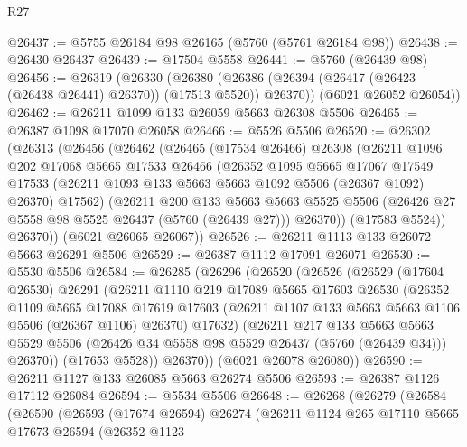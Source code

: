 \begin{lexlean}{R27}
\begin{coremodule}
@26437 := @5755 @26184 @98 @26165 (@5760 (@5761 @26184 @98))
@26438 := @26430 @26437
@26439 := @17504 @5558
@26441 := @5760 (@26439 @98)
@26456 := @26319
    (@26330
      (@26380 (@26386 (@26394 (@26417 (@26423 (@26438 @26441) @26370)) (@17513 @5520)) @26370))
      (@6021 @26052 @26054))
@26462 := @26211 @1099 @133 @26059 @5663 @26308 @5506
@26465 := @26387 @1098 @17070 @26058
@26466 := @5526 @5506
@26520 := @26302
    (@26313
      (@26456
        (@26462
          (@26465
            (@17534 @26466)
            @26308
            (@26211
              @1096
              @202
              @17068
              @5665
              @17533
              @26466
              (@26352
                @1095
                @5665
                @17067
                @17549
                @17533
                (@26211 @1093 @133 @5663 @5663 @1092 @5506 (@26367 @1092) @26370)
                @17562)
              (@26211
                @200
                @133
                @5663
                @5663
                @5525
                @5506
                (@26426 @27 @5558 @98 @5525 @26437 (@5760 (@26439 @27)))
                @26370))
            (@17583 @5524))
          @26370))
      (@6021 @26065 @26067))
@26526 := @26211 @1113 @133 @26072 @5663 @26291 @5506
@26529 := @26387 @1112 @17091 @26071
@26530 := @5530 @5506
@26584 := @26285
    (@26296
      (@26520
        (@26526
          (@26529
            (@17604 @26530)
            @26291
            (@26211
              @1110
              @219
              @17089
              @5665
              @17603
              @26530
              (@26352
                @1109
                @5665
                @17088
                @17619
                @17603
                (@26211 @1107 @133 @5663 @5663 @1106 @5506 (@26367 @1106) @26370)
                @17632)
              (@26211
                @217
                @133
                @5663
                @5663
                @5529
                @5506
                (@26426 @34 @5558 @98 @5529 @26437 (@5760 (@26439 @34)))
                @26370))
            (@17653 @5528))
          @26370))
      (@6021 @26078 @26080))
@26590 := @26211 @1127 @133 @26085 @5663 @26274 @5506
@26593 := @26387 @1126 @17112 @26084
@26594 := @5534 @5506
@26648 := @26268
    (@26279
      (@26584
        (@26590
          (@26593
            (@17674 @26594)
            @26274
            (@26211
              @1124
              @265
              @17110
              @5665
              @17673
              @26594
              (@26352
                @1123

\end{coremodule}
\end{lexlean}
